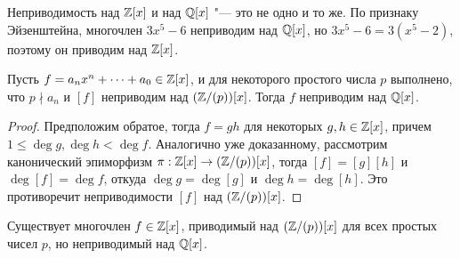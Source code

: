 \begin{note}
	Неприводимость над $\mathbb{Z}[x]$ и над $\mathbb{Q}[x]$ "--- это не одно и то же. По признаку Эйзенштейна, многочлен $3x^5 - 6$ неприводим над $\mathbb{Q}[x]$, но $3x^5 - 6 = 3(x^5 - 2)$, поэтому он приводим над $\mathbb{Z}[x]$.
\end{note}

\begin{proposition}
	Пусть $f = a_nx^n + \dotsb + a_0 \in \mathbb{Z}[x]$, и для некоторого простого числа $p$ выполнено, что $p \nmid a_n$ и $[f]$ неприводим над $(\mathbb{Z} / (p))[x]$. Тогда $f$ неприводим над $\mathbb{Q}[x]$.
\end{proposition}

\begin{proof}
	Предположим обратое, тогда $f = gh$ для некоторых $g, h \in \mathbb{Z}[x]$, причем $1 \le \deg{g}, \deg{h} < \deg{f}$. Аналогично уже доказанному, рассмотрим канонический эпиморфизм $\pi: \mathbb{Z}[x] \to (\mathbb{Z} / (p))[x]$, тогда $[f] = [g][h]$ и $\deg[f] = \deg{f}$, откуда $\deg{g} = \deg[g]$ и $\deg{h} = \deg[h]$. Это противоречит неприводимости $[f]$ над $(\mathbb{Z} / (p))[x]$.
\end{proof}

\begin{note}
	Существует многочлен $f \in \mathbb{Z}[x]$, приводимый над $(\mathbb{Z} / (p))[x]$ для всех простых чисел $p$, но неприводимый над $\mathbb{Q}[x]$.
\end{note}